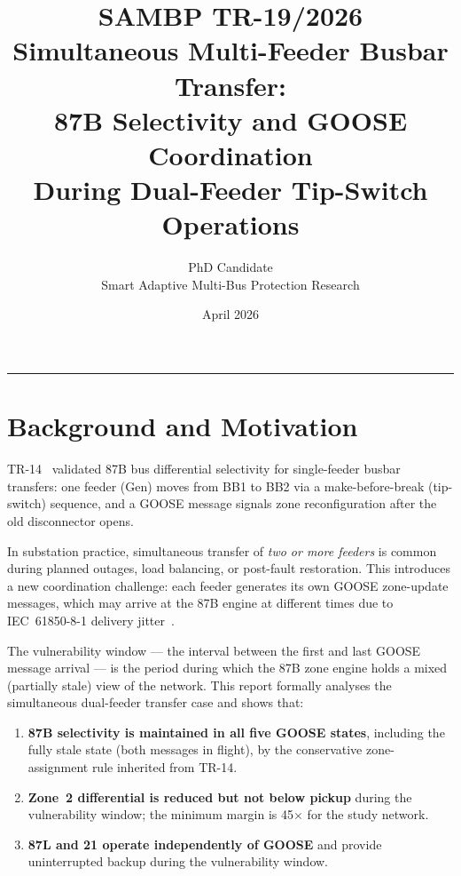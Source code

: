 \documentclass[11pt, a4paper]{article}
\title{\textbf{SAMBP TR-19/2026}\\[4pt]
       \large Simultaneous Multi-Feeder Busbar Transfer:\\
       87B Selectivity and GOOSE Coordination\\
       During Dual-Feeder Tip-Switch Operations}
\author{PhD Candidate\\[2pt]
        \small Smart Adaptive Multi-Bus Protection Research}
\date{April 2026}
\begin{document}
\maketitle
\tableofcontents
\vspace{6pt}\hrule\vspace{10pt}

\section{Background and Motivation}
\label{sec:background}

TR-14~\cite{SAMBP_TR14} validated 87B bus differential selectivity for
single-feeder busbar transfers: one feeder (Gen) moves from BB1 to BB2 via a
make-before-break (tip-switch) sequence, and a GOOSE message signals zone
reconfiguration after the old disconnector opens.

In substation practice, simultaneous transfer of \emph{two or more feeders}
is common during planned outages, load balancing, or post-fault restoration.
This introduces a new coordination challenge: each feeder generates its own
GOOSE zone-update messages, which may arrive at the 87B engine at different
times due to IEC~61850-8-1 delivery jitter~\cite{IEC_61850_8_1}.

The vulnerability window --- the interval between the first and last GOOSE
message arrival --- is the period during which the 87B zone engine holds a
mixed (partially stale) view of the network.  This report formally analyses
the simultaneous dual-feeder transfer case and shows that:

\begin{enumerate}
  \item \textbf{87B selectivity is maintained in all five GOOSE states},
        including the fully stale state (both messages in flight), by the
        conservative zone-assignment rule inherited from TR-14.
  \item \textbf{Zone~2 differential is reduced but not below pickup}
        during the vulnerability window; the minimum margin is 45$\times$
        for the study network.
  \item \textbf{87L and 21 operate independently of GOOSE} and provide
        uninterrupted backup during the vulnerability window.
\end{enumerate}


\end{document}

